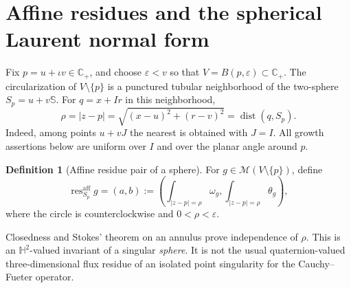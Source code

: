\documentclass[11pt,a4paper]{article}
\numberwithin{equation}{section}
\theoremstyle{definition}
\newtheorem{definition}[theorem]{Definition}
\theoremstyle{remark}
\newcommand{\C}{\mathbb C}
\newcommand{\HH}{\mathbb H}
\newcommand{\SSS}{\mathbb S}
\newcommand{\Cp}{\C_+}
\newcommand{\cM}{\mathscr M}
\newcommand{\resaff}{\operatorname{res}^{\mathrm{aff}}}
\begin{document}
\section{Affine residues and the spherical Laurent normal form}
\label{sec:normal}

Fix $p=u+\iota v\in\Cp$, and choose $\varepsilon<v$ so that
$V=B(p,\varepsilon)\subset\Cp$. The circularization of $V\setminus\{p\}$
is a punctured tubular neighborhood of the two-sphere $S_p=u+v\SSS$.
For $q=x+Ir$ in this neighborhood,
\begin{equation}
 \rho=|z-p|=\sqrt{(x-u)^2+(r-v)^2}
             =\operatorname{dist}(q,S_p).
 \label{eq:distance}
\end{equation}
Indeed, among points $u+vJ$ the nearest is obtained with $J=I$.
All growth assertions below are uniform over $I$ and over the planar angle
around $p$.

\begin{definition}[Affine residue pair of a sphere]
For $g\in\cM(V\setminus\{p\})$, define
\begin{equation}
 \resaff_{S_p}g=(a,b)
   :=\left(\int_{|z-p|=\rho}\omega_g,
           \int_{|z-p|=\rho}\theta_g\right),
 \label{eq:resaff}
\end{equation}
where the circle is counterclockwise and $0<\rho<\varepsilon$.
\end{definition}
Closedness and Stokes' theorem on an annulus prove independence of $\rho$.
This is an $\HH^2$-valued invariant of a singular \emph{sphere}. It is not
the usual quaternion-valued three-dimensional flux residue of an isolated
point singularity for the Cauchy--Fueter operator.
\end{document}
